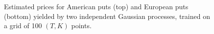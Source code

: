 \documentclass[a4paper,12pt]{article}
\begin{document}
\begin{figure}[H]
\begin{minipage}[c]{.9\linewidth}
    \centering
\end{minipage} \vfill
\begin{minipage}[c]{.9\linewidth}
    \centering
\end{minipage}
\caption{Estimated prices for American puts (top) and European puts (bottom) yielded by two independent Gaussian processes, trained on a grid of 100 $(T, K)$ points.}
\label{fig:mogp_indep_training}
\end{figure}
\end{document}
